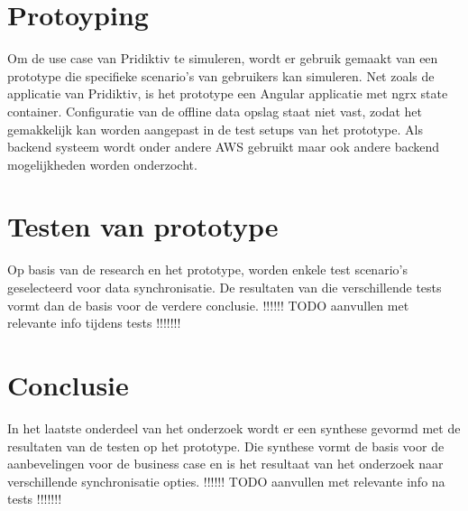 \section{Protoyping}
Om de use case van Pridiktiv te simuleren, wordt er gebruik gemaakt van een prototype die specifieke scenario's van gebruikers kan simuleren. Net zoals de applicatie van Pridiktiv, is het prototype een Angular applicatie met ngrx state container. Configuratie van de offline data opslag staat niet vast, zodat het gemakkelijk kan worden aangepast in de test setups van het prototype. Als backend systeem wordt onder andere AWS gebruikt maar ook andere backend mogelijkheden worden onderzocht.
\section{Testen van prototype}
Op basis van de research en het prototype, worden enkele test scenario's geselecteerd voor data synchronisatie. De resultaten van die verschillende tests vormt dan de basis voor de verdere conclusie. !!!!!! TODO aanvullen met relevante info tijdens tests !!!!!!!
\section{Conclusie}
In het laatste onderdeel van het onderzoek wordt er een synthese gevormd met de resultaten van de testen op het prototype. Die synthese vormt de basis voor de aanbevelingen voor de business case en is het resultaat van het onderzoek naar verschillende synchronisatie opties. !!!!!! TODO aanvullen met relevante info na tests !!!!!!!

